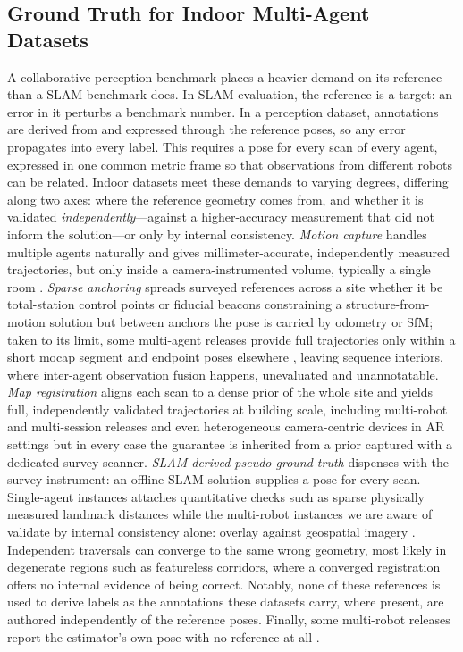 \documentclass[conference]{IEEEtran}
\begin{document}
\subsection{Ground Truth for Indoor Multi-Agent Datasets}
A collaborative-perception benchmark places a heavier demand on its
reference than a SLAM benchmark does. In SLAM evaluation, the
reference is a target: an error in it perturbs a benchmark number.
In a perception dataset, annotations
are derived from and expressed through the reference poses, so any
error propagates into every label. This requires a pose for every
scan of every agent, expressed in one common metric frame so that
observations from different robots can be related. Indoor datasets
meet these demands to varying degrees, differing along two axes:
where the reference geometry comes from, and whether it is validated
\emph{independently}---against a higher-accuracy measurement that did
not inform the solution---or only by internal consistency.
\emph{Motion capture} handles multiple agents naturally and gives
millimeter-accurate, independently measured trajectories, but only
inside a camera-instrumented volume, typically a single room
\cite{utias,m2dgr}. \emph{Sparse anchoring} spreads surveyed
references across a site whether it be total-station control points
\cite{hilti2022} or fiducial beacons constraining a
structure-from-motion solution \cite{airmuseum} but between anchors
the pose is carried by odometry or SfM; taken to its limit, some
multi-agent releases provide full trajectories only within a short
mocap segment and endpoint poses elsewhere \cite{s3e}, leaving
sequence interiors, where inter-agent observation fusion
happens, unevaluated and unannotatable. \emph{Map registration}
aligns each scan to a dense prior of the whole site and yields full,
independently validated trajectories at building scale, including
multi-robot and multi-session releases \cite{subtmrs}
and even heterogeneous camera-centric devices in AR settings
\cite{lamar} but in every case the guarantee is inherited from a
prior captured with a dedicated survey scanner.
\emph{SLAM-derived pseudo-ground truth} dispenses with the survey
instrument: an offline SLAM solution supplies a pose for every scan.
Single-agent instances attaches quantitative
checks such as sparse physically measured landmark distances
\cite{incrowdvi} while
the multi-robot instances we are aware of validate by internal
consistency alone: overlay against geospatial imagery \cite{envodat}. Independent traversals can converge to the same wrong geometry, most likely in degenerate regions such as featureless corridors, where a converged registration offers no internal evidence of being correct. Notably, none of these references is used to derive labels
as the annotations these datasets carry, where present, are authored
independently of the reference poses. Finally, some multi-robot
releases report the estimator's own pose with no reference at all
\cite{coped}.
\end{document}
